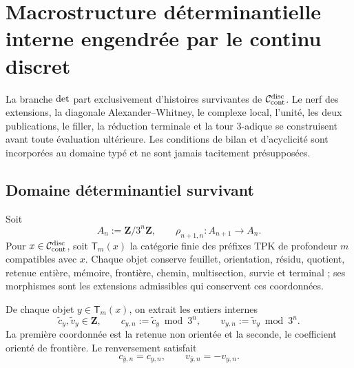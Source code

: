 \iffalse
\chapter[Macrostructure déterminantielle interne]{Macrostructure déterminantielle interne engendrée par le continu discret}
\label{chap:detint-macroestructura}

\begin{thesisbox}
La branche \({\rm det}\) part exclusivement d'histoires survivantes de
\(\mathcal C_{\rm cont}^{\rm disc}\). Le nerf des extensions, la diagonale
Alexander--Whitney, le complexe local, l'unité, les deux publications, le
filler, la réduction terminale et la tour \(3\)-adique se construisent avant
toute évaluation ultérieure. Les conditions de bilan et d'acyclicité sont
incorporées au domaine typé et ne sont jamais tacitement présupposées.
\end{thesisbox}

\section{Domaine déterminantiel survivant}

Soit
\begin{equation}\label{eq:detint-an}
 A_n:=\mathbf Z/3^n\mathbf Z,
 \qquad
 \rho_{n+1,n}:A_{n+1}\longrightarrow A_n.
\end{equation}
Pour \(x\in\mathcal C_{\rm cont}^{\rm disc}\), soit
\(\mathsf T_m(x)\) la catégorie finie des préfixes TPK de profondeur \(m\)
compatibles avec \(x\). Chaque objet conserve feuillet, orientation, résidu,
quotient, retenue entière, mémoire, frontière, chemin, multisection, survie
et terminal ; ses morphismes sont les extensions admissibles qui conservent ces
coordonnées.

De chaque objet \(y\in\mathsf T_m(x)\), on extrait les entiers internes
\begin{equation}\label{eq:detint-c-v-lifts}
 \widetilde c_y,\widetilde v_y\in\mathbf Z,
 \qquad
 c_{y,n}:=\widetilde c_y\bmod3^n,
 \qquad
 v_{y,n}:=\widetilde v_y\bmod3^n.
\end{equation}
La première coordonnée est la retenue non orientée et la seconde, le coefficient
orienté de frontière. Le renversement satisfait
\begin{equation}\label{eq:detint-or-cv}
 c_{\bar y,n}=c_{y,n},
 \qquad
 v_{\bar y,n}=-v_{y,n}.
\end{equation}

